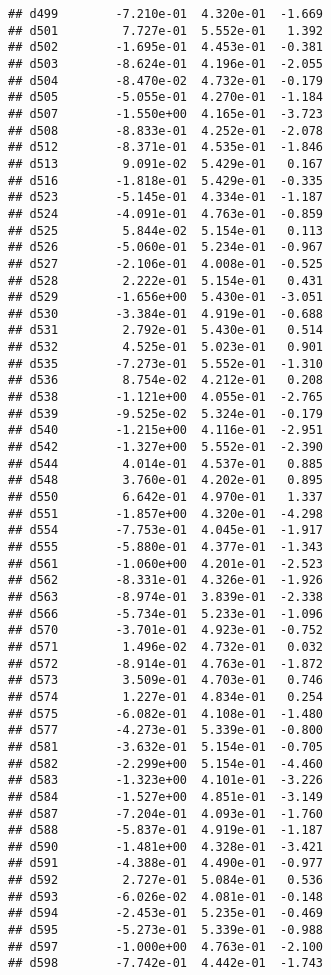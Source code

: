 \documentclass[
]{article}
\begin{document}
\begin{verbatim}
## d499        -7.210e-01  4.320e-01  -1.669
## d501         7.727e-01  5.552e-01   1.392
## d502        -1.695e-01  4.453e-01  -0.381
## d503        -8.624e-01  4.196e-01  -2.055
## d504        -8.470e-02  4.732e-01  -0.179
## d505        -5.055e-01  4.270e-01  -1.184
## d507        -1.550e+00  4.165e-01  -3.723
## d508        -8.833e-01  4.252e-01  -2.078
## d512        -8.371e-01  4.535e-01  -1.846
## d513         9.091e-02  5.429e-01   0.167
## d516        -1.818e-01  5.429e-01  -0.335
## d523        -5.145e-01  4.334e-01  -1.187
## d524        -4.091e-01  4.763e-01  -0.859
## d525         5.844e-02  5.154e-01   0.113
## d526        -5.060e-01  5.234e-01  -0.967
## d527        -2.106e-01  4.008e-01  -0.525
## d528         2.222e-01  5.154e-01   0.431
## d529        -1.656e+00  5.430e-01  -3.051
## d530        -3.384e-01  4.919e-01  -0.688
## d531         2.792e-01  5.430e-01   0.514
## d532         4.525e-01  5.023e-01   0.901
## d535        -7.273e-01  5.552e-01  -1.310
## d536         8.754e-02  4.212e-01   0.208
## d538        -1.121e+00  4.055e-01  -2.765
## d539        -9.525e-02  5.324e-01  -0.179
## d540        -1.215e+00  4.116e-01  -2.951
## d542        -1.327e+00  5.552e-01  -2.390
## d544         4.014e-01  4.537e-01   0.885
## d548         3.760e-01  4.202e-01   0.895
## d550         6.642e-01  4.970e-01   1.337
## d551        -1.857e+00  4.320e-01  -4.298
## d554        -7.753e-01  4.045e-01  -1.917
## d555        -5.880e-01  4.377e-01  -1.343
## d561        -1.060e+00  4.201e-01  -2.523
## d562        -8.331e-01  4.326e-01  -1.926
## d563        -8.974e-01  3.839e-01  -2.338
## d566        -5.734e-01  5.233e-01  -1.096
## d570        -3.701e-01  4.923e-01  -0.752
## d571         1.496e-02  4.732e-01   0.032
## d572        -8.914e-01  4.763e-01  -1.872
## d573         3.509e-01  4.703e-01   0.746
## d574         1.227e-01  4.834e-01   0.254
## d575        -6.082e-01  4.108e-01  -1.480
## d577        -4.273e-01  5.339e-01  -0.800
## d581        -3.632e-01  5.154e-01  -0.705
## d582        -2.299e+00  5.154e-01  -4.460
## d583        -1.323e+00  4.101e-01  -3.226
## d584        -1.527e+00  4.851e-01  -3.149
## d587        -7.204e-01  4.093e-01  -1.760
## d588        -5.837e-01  4.919e-01  -1.187
## d590        -1.481e+00  4.328e-01  -3.421
## d591        -4.388e-01  4.490e-01  -0.977
## d592         2.727e-01  5.084e-01   0.536
## d593        -6.026e-02  4.081e-01  -0.148
## d594        -2.453e-01  5.235e-01  -0.469
## d595        -5.273e-01  5.339e-01  -0.988
## d597        -1.000e+00  4.763e-01  -2.100
## d598        -7.742e-01  4.442e-01  -1.743

\end{verbatim}
\end{document}
